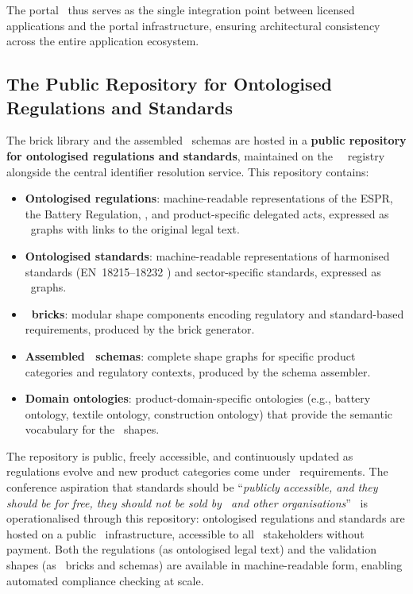 The portal \API\ thus serves as the single integration point between licensed
applications and the portal infrastructure, ensuring architectural consistency
across the entire application ecosystem.

\subsection{The Public Repository for Ontologised Regulations and Standards}

The brick library and the assembled \SHACL\ schemas are hosted in a
\textbf{public repository for ontologised regulations and standards}, maintained
on the \EC\ \DPP\ registry alongside the central identifier resolution service.
This repository contains:

\begin{itemize}
\item \textbf{Ontologised regulations}: machine-readable representations of the
ESPR, the Battery Regulation, \REACH, and product-specific delegated acts,
expressed as \RDF\ graphs with links to the original legal text.
\item \textbf{Ontologised standards}: machine-readable representations of
harmonised standards (EN~18215--18232 \cite{en18215}) and sector-specific
standards, expressed as \RDF\ graphs.
\item \textbf{\SHACL\ bricks}: modular shape components encoding regulatory and
standard-based requirements, produced by the brick generator.
\item \textbf{Assembled \SHACL\ schemas}: complete shape graphs for specific
product categories and regulatory contexts, produced by the schema assembler.
\item \textbf{Domain ontologies}: product-domain-specific ontologies (e.g.,
battery ontology, textile ontology, construction ontology) that provide the
semantic vocabulary for the \SHACL\ shapes.
\end{itemize}

The repository is public, freely accessible, and continuously updated as
regulations evolve and new product categories come under \DPP\ requirements. The
conference aspiration that standards should be ``\textit{publicly accessible,
and they should be for free, they should not be sold by \DIN\ and other
organisations}''~\cite{dpp4eu2026_day2} is operationalised through this
repository: ontologised regulations and standards are hosted on a public \EC\
infrastructure, accessible to all \DPP\ stakeholders without payment. Both the
regulations (as ontologised legal text) and the validation shapes (as \SHACL\
bricks and schemas) are available in machine-readable form, enabling automated
compliance checking at scale.

